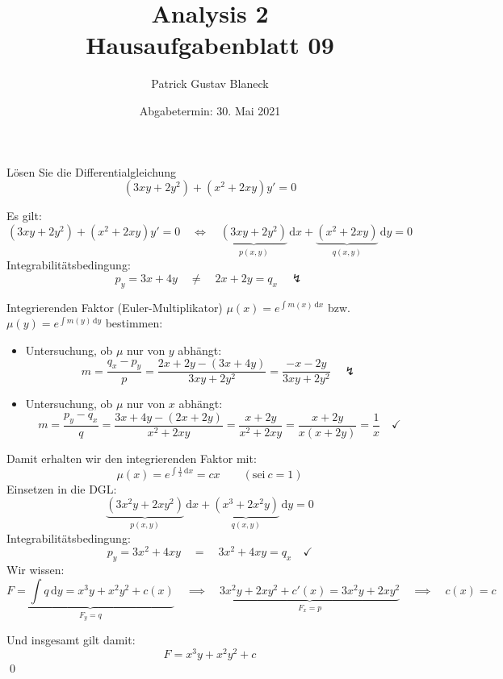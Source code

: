 \documentclass[answers]{exam}
\title{Analysis 2 \\ \large{Hausaufgabenblatt 09}}
\author{Patrick Gustav Blaneck}
\date{Abgabetermin: 30. Mai 2021}
\renewcommand{\d}{\,\mathrm{d}}
\begin{document}
\maketitle
\begin{questions}
    \question
    Lösen Sie die Differentialgleichung
    $$
        (3xy + 2y^2) + (x^2 + 2xy) y' = 0
    $$
    \begin{solution}
        Es gilt:
        $$
            (3xy + 2y^2) + (x^2 + 2xy) y' = 0 \quad \iff \quad \underbrace{(3xy + 2y^2)}_{p(x, y)}\d x + \underbrace{(x^2 + 2xy)}_{q(x, y)}\d y = 0
        $$
        Integrabilitätsbedingung:
        $$
            p_y = 3x + 4y \quad \neq \quad 2x + 2y = q_x \quad \lightning
        $$

        Integrierenden Faktor (Euler-Multiplikator) $\mu(x) = e^{\int m(x) \d x}$ bzw. $\mu(y) = e^{\int m(y) \d y}$ bestimmen:
        \begin{itemize}
            \item Untersuchung, ob $\mu$ nur von $y$ abhängt:
                  $$
                      m = \frac{q_x - p_y}{p} = \frac{2x + 2y - \left(3x + 4y\right)}{3xy + 2y^2} = \frac{-x - 2y}{3xy + 2y^2} \quad \lightning
                  $$
            \item Untersuchung, ob $\mu$ nur von $x$ abhängt:
                  $$
                      m = \frac{p_y - q_x}{q} = \frac{3x + 4y - (2x + 2y)}{x^2 + 2xy} = \frac{x + 2y}{x^2 + 2xy} = \frac{x+2y}{x(x+2y)} = \frac{1}{x} \quad \checkmark
                  $$
        \end{itemize}

        Damit erhalten wir den integrierenden Faktor mit:
        $$
            \mu(x) = e^{\int \frac{1}{x} \d x} = cx \qquad (\text{sei} \ c = 1)
        $$
        Einsetzen in die DGL:
        $$
            \underbrace{\left(3x^2y + 2xy^2\right)}_{p(x, y)}\d x + \underbrace{\left(x^3 + 2x^2y\right)}_{q(x, y)}\d y = 0
        $$
        Integrabilitätsbedingung:
        $$
            p_y = 3x^2 + 4xy \quad = \quad 3x^2 + 4xy = q_x \quad \checkmark
        $$
        Wir wissen:
        $$
            \underbrace{F = \int q \d y = x^3y + x^2y^2 + c(x)}_{F_y = q} \quad \implies \quad \underbrace{3x^2y + 2xy^2 + c'(x) = 3x^2y + 2xy^2}_{F_x = p} \quad \implies \quad c(x) = c
        $$

        Und insgesamt gilt damit:
        $$
            F = x^3y + x^2y^2 + c
        $$\qed
    \end{solution}


\end{questions}
\end{document}
